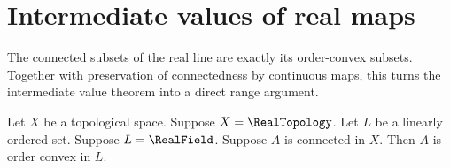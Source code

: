 \section{Intermediate values of real maps}



The connected subsets of the real line are exactly its order-convex subsets.
Together with preservation of connectedness by continuous maps, this turns
the intermediate value theorem into a direct range argument.

\begin{theorem}\label{real_connected_set_is_order_convex}
    Let $X$ be a topological space.
    Suppose $X=\RealTopology$.
    Let $L$ be a linearly ordered set.
    Suppose $L=\RealField$.
    Suppose $A$ is connected in $X$.
    Then $A$ is order convex in $L$.
\end{theorem}
